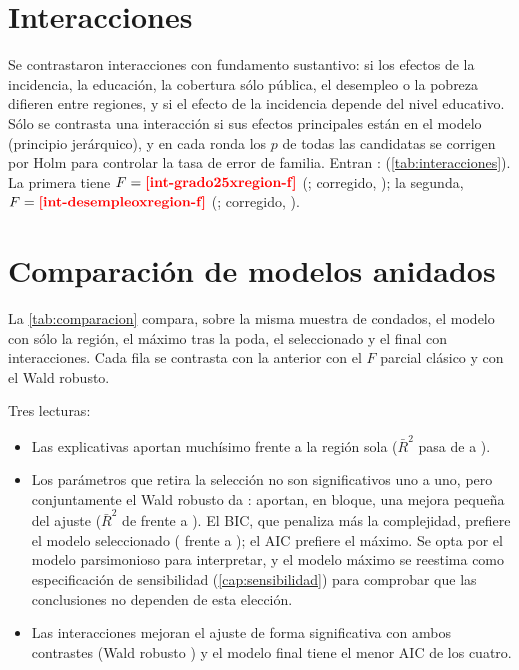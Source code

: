 \section{Interacciones}

Se contrastaron  interacciones con fundamento sustantivo: si los
efectos de la incidencia, la educación, la cobertura sólo pública, el desempleo o la pobreza
difieren entre regiones, y si el efecto de la incidencia depende del nivel educativo. Sólo se
contrasta una interacción si sus efectos principales están en el modelo (principio jerárquico), y
en cada ronda los $p$ de todas las candidatas se corrigen por Holm para controlar la tasa de error
de familia. Entran : 
(\cref{tab:interacciones}). La primera tiene $F=\res{int-grado25xregion-f}$
(; corregido, ); la segunda,
$F=\res{int-desempleoxregion-f}$ (; corregido,
).



\section{Comparación de modelos anidados}\label{sec:comparacion}

La \cref{tab:comparacion} compara, sobre la misma muestra de  condados, el modelo
con sólo la región, el máximo tras la poda, el seleccionado y el final con interacciones. Cada fila
se contrasta con la anterior con el $F$ parcial clásico y con el Wald robusto.



Tres lecturas:
\begin{itemize}
  \item Las explicativas aportan muchísimo frente a la región sola ($\bar R^2$ pasa de
   a ).
  \item Los  parámetros que retira la selección no son significativos uno a
  uno, pero conjuntamente el Wald robusto da : aportan, en bloque, una
  mejora pequeña del ajuste ($\bar R^2$ de  frente a
  ). El BIC, que penaliza más la complejidad, prefiere el modelo seleccionado
  ( frente a ); el AIC prefiere el máximo. Se opta por
  el modelo parsimonioso para interpretar, y el modelo máximo se reestima como especificación de
  sensibilidad (\cref{cap:sensibilidad}) para comprobar que las conclusiones no dependen de esta
  elección.
  \item Las interacciones mejoran el ajuste de forma significativa con ambos contrastes
  (Wald robusto ) y el modelo final tiene el menor AIC de los cuatro.
\end{itemize}

